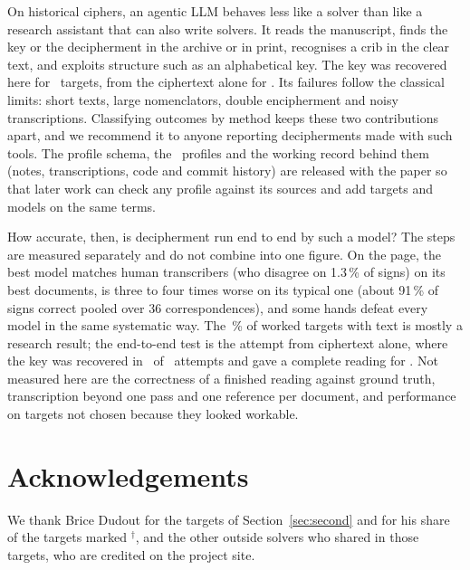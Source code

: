 \documentclass[11pt]{article}
\newif\ifanon
\begin{document}
On historical ciphers, an agentic LLM behaves less like a solver than like a research assistant that can also write solvers. It reads the manuscript, finds the key or the decipherment in the archive or in print, recognises a crib in the clear text, and exploits structure such as an alphabetical key. The key was recovered here for \Nrecovered\ targets, from the ciphertext alone for \NCT. Its failures follow the classical limits: short texts, large nomenclators, double encipherment and noisy transcriptions. Classifying outcomes by method keeps these two contributions apart, and we recommend it to anyone reporting decipherments made with such tools. The profile schema, the \Ntargets\ profiles and the working record behind them (notes, transcriptions, code and commit history) are released with the paper so that later work can check any profile against its sources and add targets and models on the same terms.

How accurate, then, is decipherment run end to end by such a model? The steps are measured separately and do not combine into one figure. On the page, the best model matches human transcribers (who disagree on 1.3\,\% of signs) on its best documents, is three to four times worse on its typical one (about 91\,\% of signs correct pooled over 36 correspondences), and some hands defeat every model in the same systematic way. The \PctObtained\,\% of worked targets with text is mostly a research result; the end-to-end test is the attempt from ciphertext alone, where the key was recovered in \NctoCT\ of \Ncto\ attempts and gave a complete reading for \NCTcomplete. Not measured here are the correctness of a finished reading against ground truth, transcription beyond one pass and one reference per document, and performance on targets not chosen because they looked workable.

\ifanon\else
\section*{Acknowledgements}
We thank Brice Dudout for the targets of Section~\ref{sec:second} and for his share of the targets marked $^\dagger$, and the other outside solvers who shared in those targets, who are credited on the project site.
\fi




\appendix

\end{document}
